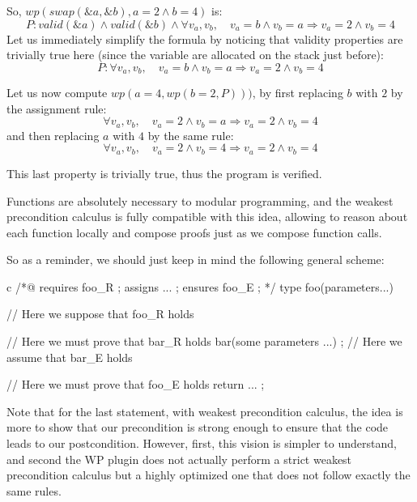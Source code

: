 So, $wp(swap(\&a, \&b), a = 2 \wedge b = 4)$ is:
$$P: valid(\&a) \wedge valid(\&b) \wedge \forall v_a, v_b, \quad v_a = b \wedge v_b = a \Rightarrow v_a = 2 \wedge v_b = 4$$
Let us immediately simplify the formula by noticing that validity properties
are trivially true here (since the variable are allocated on the stack just
before):
$$P: \forall v_a, v_b, \quad v_a = b \wedge v_b = a \Rightarrow v_a = 2 \wedge v_b = 4$$


Let us now compute $wp(a = 4, wp(b = 2, P)))$, by first replacing $b$ with
$2$ by the assignment rule:
$$\forall v_a, v_b, \quad v_a = 2 \wedge v_b = a \Rightarrow v_a = 2 \wedge v_b = 4$$
and then replacing $a$ with $4$ by the same rule:
$$\forall v_a, v_b, \quad v_a = 2 \wedge v_b = 4 \Rightarrow v_a = 2 \wedge v_b = 4$$


This last property is trivially true, thus the program is verified.






Functions are absolutely necessary to modular programming, and the weakest
precondition calculus is fully compatible with this idea, allowing to reason
about each function locally and compose proofs just as we compose function
calls.


So as a reminder, we should just keep in mind the following general scheme:



\begin{CodeBlock}{c}
/*@
  requires foo_R ;
  assigns ... ;
  ensures foo_E ;
*/
type foo(parameters...){
  // Here we suppose that foo_R holds


  // Here we must prove that bar_R holds
  bar(some parameters ...) ;
  // Here we assume that bar_E holds


  // Here we must prove that foo_E holds
  return ... ;
}
\end{CodeBlock}


Note that for the last statement, with weakest precondition calculus, the idea
is more to show that our precondition is strong enough to ensure that the code
leads to our postcondition. However, first, this vision is simpler to
understand, and second the WP plugin does not actually perform a strict weakest
precondition calculus but a highly optimized one that does not follow exactly
the same rules.





